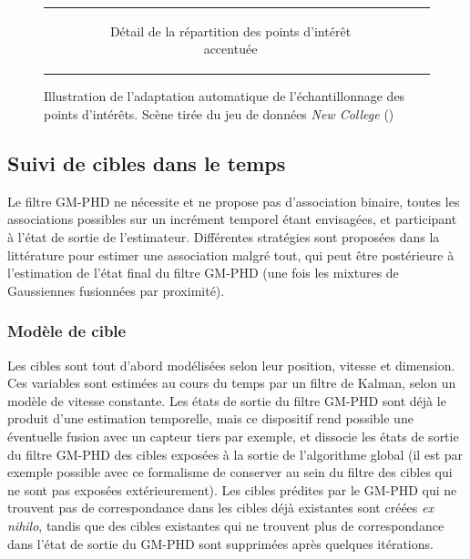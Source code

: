 \begin{figure}[h]
{\begin{tabular} {c c}
\begin{subfigure}{0.28\textwidth}
				\caption{Détail de la répartition des points d'intérêt accentuée}
			\end{subfigure}	
		\end{tabular}
	}
	\caption{Illustration de l'adaptation automatique de l'échantillonnage des points d'intérêts. Scène tirée du jeu de données \emph{New College} (\cite{Smith2009}) }
	\label{fig:ch5_a_s_results}
\end{figure}

\subsection{Suivi de cibles dans le temps}
Le filtre GM-PHD ne nécessite et ne propose pas d'association binaire, toutes les associations possibles sur un incrément temporel étant envisagées, et participant à l'état de sortie de l'estimateur. Différentes stratégies sont proposées dans la littérature pour estimer une association malgré tout, qui peut être postérieure à l'estimation de l'état final du filtre GM-PHD (une fois les mixtures de Gaussiennes fusionnées par proximité).

\subsubsection{Modèle de cible}
Les cibles sont tout d'abord modélisées selon leur position, vitesse et dimension. Ces variables sont estimées au cours du temps par un filtre de Kalman, selon un modèle de vitesse constante. Les états de sortie du filtre GM-PHD sont déjà le produit d'une estimation temporelle, mais ce dispositif rend possible une éventuelle fusion avec un capteur tiers par exemple, et dissocie les états de sortie du filtre GM-PHD des cibles exposées à la sortie de l'algorithme global (il est par exemple possible avec ce formalisme de conserver au sein du filtre des cibles qui ne sont pas exposées extérieurement). Les cibles prédites par le GM-PHD qui ne trouvent pas de correspondance dans les cibles déjà existantes sont créées \textit{ex nihilo}, tandis que des cibles existantes qui ne trouvent plus de correspondance dans l'état de sortie du GM-PHD sont supprimées après quelques itérations.


